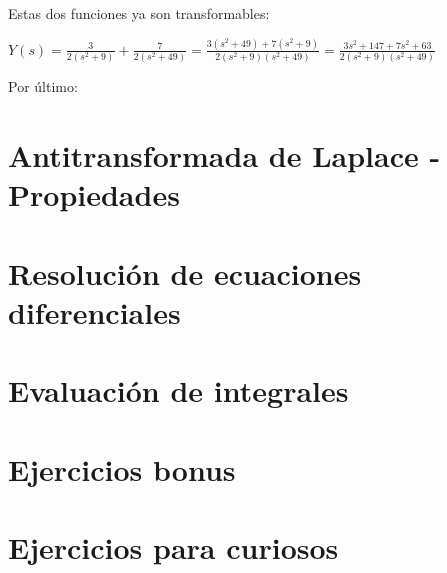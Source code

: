 \documentclass[11pt]{article}
\begin{document}
	Estas dos funciones ya son transformables:
	
	$\displaystyle Y(s)=\frac{3}{2(s^{2}+9)}+\frac{7}{2(s^{2}+49)}=\frac{3(s^{2}+49)+7(s^{2}+9)}{2(s^{2}+9)(s^{2}+49)}=\frac{3s^2+147+7s^2+63}{2(s^2+9)(s^2+49)}$
	
	Por último: 
	
	\section{Antitransformada de Laplace - Propiedades}
	\section{Resolución de ecuaciones diferenciales}
	\section{Evaluación de integrales}
	\section{Ejercicios bonus}
	\section{Ejercicios para curiosos}
\end{document}
